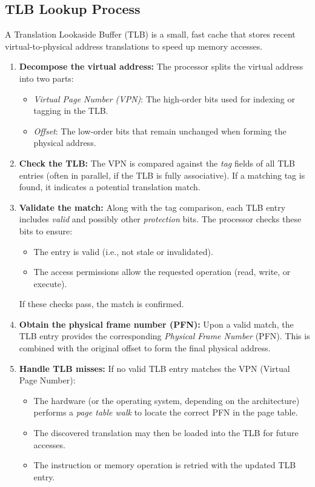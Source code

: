 \subsection{TLB Lookup Process}
A Translation Lookaside Buffer (TLB) is a small, fast cache that stores recent virtual-to-physical address translations to speed up memory accesses. \\[9px]
\noindent
\begin{minipage}{0.45\textwidth}
\small
\begin{enumerate}
    \item \textbf{Decompose the virtual address:} 
    The processor splits the virtual address into two parts:
    \begin{itemize}
        \item \textit{Virtual Page Number (VPN)}: The high-order bits used for indexing or tagging in the TLB.
        \item \textit{Offset}: The low-order bits that remain unchanged when forming the physical address.
    \end{itemize}
    
    \item \textbf{Check the TLB:} The VPN is compared against the \emph{tag} fields of all TLB entries (often in parallel, if the TLB is fully associative). If a matching tag is found, it indicates a potential translation match.

    \item \textbf{Validate the match:}
    Along with the tag comparison, each TLB entry includes \emph{valid} and possibly other \emph{protection} bits. The processor checks these bits to ensure:
    \begin{itemize}
        \item The entry is valid (i.e., not stale or invalidated).
        \item The access permissions allow the requested operation (read, write, or execute).
    \end{itemize}
    If these checks pass, the match is confirmed.

    \item \textbf{Obtain the physical frame number (PFN):} Upon a valid match, the TLB entry provides the corresponding \emph{Physical Frame Number} (PFN). This is combined with the original offset to form the final physical address.

    \item \textbf{Handle TLB misses:}
    If no valid TLB entry matches the VPN (Virtual Page Number):
    \begin{itemize}
        \item The hardware (or the operating system, depending on the architecture) performs a \emph{page table walk} to locate the correct PFN in the page table.
        \item The discovered translation may then be loaded into the TLB for future accesses.
        \item The instruction or memory operation is retried with the updated TLB entry.
    \end{itemize}
\end{enumerate}
\end{minipage}%
